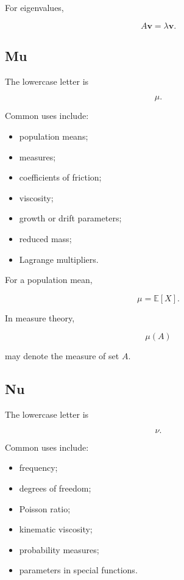 For eigenvalues,

\[
\boxed{
A\mathbf{v}
=
\lambda\mathbf{v}.
}
\]

\subsection{Mu}
\label{subsec:greek-mu}

The lowercase letter is

\[
\boxed{
\mu.
}
\]

Common uses include:

\begin{itemize}
    \item population means;
    \item measures;
    \item coefficients of friction;
    \item viscosity;
    \item growth or drift parameters;
    \item reduced mass;
    \item Lagrange multipliers.
\end{itemize}

For a population mean,

\[
\boxed{
\mu
=
\mathbb{E}[X].
}
\]

In measure theory,

\[
\boxed{
\mu(A)
}
\]

may denote the measure of set \(A\).

\subsection{Nu}
\label{subsec:greek-nu}

The lowercase letter is

\[
\boxed{
\nu.
}
\]

Common uses include:

\begin{itemize}
    \item frequency;
    \item degrees of freedom;
    \item Poisson ratio;
    \item kinematic viscosity;
    \item probability measures;
    \item parameters in special functions.
\end{itemize}

